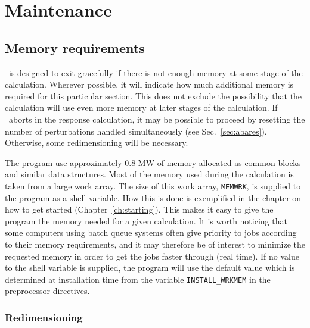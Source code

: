 \chapter{Maintenance}\label{ch:maintain}

\section{Memory requirements}

\dalton\ is designed to exit gracefully if there is not enough
memory at some stage of the calculation.  Wherever possible, it
will indicate how much additional memory is required for this
particular section.  This does not exclude the possibility that
the calculation will use even more memory at later stages of the
calculation. If \dalton\ aborts in the response calculation, it
may be possible to proceed by resetting the number of
perturbations handled simultaneously (see 
Sec.~\ref{sec:abares}).  Otherwise, some redimensioning will be
necessary.

The program use approximately 0.8 MW of memory allocated as common
blocks and similar data structures. Most of the memory used during the
calculation is taken from a large work array. The size of this work
array,
\verb|MEMWRK|, is supplied to the program as a shell
variable. How this is done is
exemplified in the chapter on how to get started
(Chapter~\ref{ch:starting}). This makes it easy
to give the program the memory needed for a given calculation. It is
worth noticing that some computers using batch queue systems often
give priority to jobs according to their memory requirements, and it may
therefore be of interest to minimize the requested memory in order to
get the jobs faster through (real time). If no value to the shell
variable is supplied, the program will use the  default value which is
determined at installation time from the variable
\verb|INSTALL_WRKMEM| in the preprocessor
directives.

\subsection{Redimensioning \dalton}

